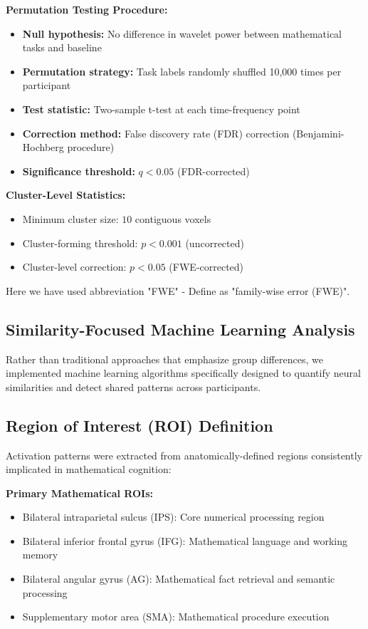 \vspace{0.5\baselineskip}
\noindent
\textbf{Permutation Testing Procedure:}
\begin{itemize}
\item \textbf{Null hypothesis:} No difference in wavelet power between mathematical tasks and baseline
\item \textbf{Permutation strategy:} Task labels randomly shuffled 10,000 times per participant
\item \textbf{Test statistic:} Two-sample t-test at each time-frequency point
\item \textbf{Correction method:} False discovery rate (FDR) correction (Benjamini-Hochberg procedure)
\item \textbf{Significance threshold:} $q < 0.05$ (FDR-corrected)
\end{itemize}

\noindent
\textbf{Cluster-Level Statistics:}
\begin{itemize}
\item Minimum cluster size: $10$ contiguous voxels
\item Cluster-forming threshold: $p < 0.001$ (uncorrected)
\item Cluster-level correction: $p < 0.05$ (FWE-corrected)
\end{itemize}
Here we have used abbreviation "FWE" - Define as "family-wise error (FWE)".

\subsection{Similarity-Focused Machine Learning Analysis}
Rather than traditional approaches that emphasize group differences, we implemented machine learning algorithms specifically designed to quantify neural similarities and detect shared patterns across participants.

\subsection{Region of Interest (ROI) Definition}
Activation patterns were extracted from anatomically-defined regions consistently implicated in mathematical cognition:

\vspace{0.5\baselineskip}
\noindent
\textbf{Primary Mathematical ROIs:}
\begin{itemize}
\item Bilateral intraparietal sulcus (IPS): Core numerical processing region
\item Bilateral inferior frontal gyrus (IFG): Mathematical language and working memory
\item Bilateral angular gyrus (AG): Mathematical fact retrieval and semantic processing
\item Supplementary motor area (SMA): Mathematical procedure execution
\end{itemize}

